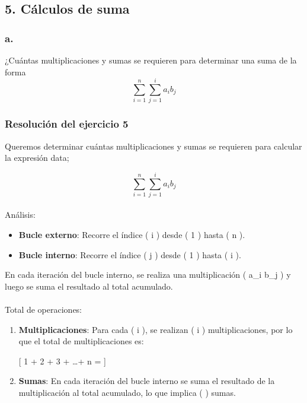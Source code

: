 \documentclass[
  letterpaper,
  DIV=11,
  numbers=noendperiod]{scrartcl}
\makeatletter
\let\oldparagraph\paragraph
\renewcommand{\paragraph}{
    \@ifstar
      \xxxParagraphStar
      \xxxParagraphNoStar
  }
\newcommand{\xxxParagraphStar}[1]{\oldparagraph*{#1}\mbox{}}
\newcommand{\xxxParagraphNoStar}[1]{\oldparagraph{#1}\mbox{}}
\providecommand{\tightlist}{%
  \setlength{\itemsep}{0pt}\setlength{\parskip}{0pt}}\usepackage{longtable,booktabs,array}
\makeatother
\begin{document}
\subsection{5. Cálculos de suma}\label{cuxe1lculos-de-suma}

\subsubsection{a.}\label{a.-2}

¿Cuántas multiplicaciones y sumas se requieren para determinar una suma
de la forma \[
\sum_{i=1}^n \sum_{j=1}^i a_i b_j
\]

\subsubsection{Resolución del ejercicio
5}\label{resoluciuxf3n-del-ejercicio-5}

Queremos determinar cuántas multiplicaciones y sumas se requieren para
calcular la expresión data;

\[
\sum_{i=1}^n \sum_{j=1}^i a_i b_j
\]

\paragraph{Análisis:}\label{anuxe1lisis}

\begin{itemize}
\tightlist
\item
  \textbf{Bucle externo}: Recorre el índice ( i ) desde ( 1 ) hasta ( n
  ).
\item
  \textbf{Bucle interno}: Recorre el índice ( j ) desde ( 1 ) hasta ( i
  ).
\end{itemize}

En cada iteración del bucle interno, se realiza una multiplicación (
a\_i \cdot b\_j ) y luego se suma el resultado al total acumulado.

\paragraph{Total de operaciones:}\label{total-de-operaciones}

\begin{enumerate}
\def\labelenumi{\arabic{enumi}.}
\item
  \textbf{Multiplicaciones}: Para cada ( i ), se realizan ( i )
  multiplicaciones, por lo que el total de multiplicaciones es:

  {[} 1 + 2 + 3 + \ldots + n =  {]}
\item
  \textbf{Sumas}: En cada iteración del bucle interno se suma el
  resultado de la multiplicación al total acumulado, lo que implica (
   ) sumas.
\end{enumerate}
\end{document}
